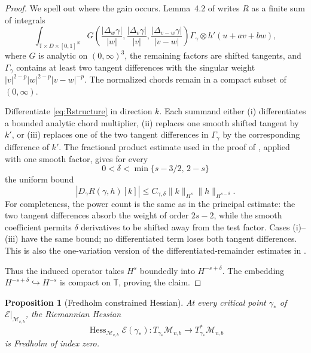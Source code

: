 \documentclass[11pt]{article}
\newtheorem{proposition}[theorem]{Proposition}
\theoremstyle{remark}
\newcommand{\T}{\mathbb T}
\newcommand{\E}{\mathcal E}
\newcommand{\M}{\mathcal M}
\begin{document}
\begin{proof}
We spell out where the gain occurs.  Lemma~4.2 of \cite{BR} writes $R$ as a
finite sum of integrals
\begin{equation}\label{eq:Rstructure}
 \int_{\T\times D\times[0,1]^N}
 G\!\left(\frac{|\Delta_w\gamma|}{|w|},
           \frac{|\Delta_v\gamma|}{|v|},
           \frac{|\Delta_{v-w}\gamma|}{|v-w|}\right)
 \Gamma_\gamma\otimes h'(u+av+bw),
\end{equation}
where $G$ is analytic on $(0,\infty)^3$, the remaining factors are shifted
tangents, and $\Gamma_\gamma$ contains at least two tangent differences with
the singular weight
$|v|^{2-p}|w|^{2-p}|v-w|^{-p}$.  The normalized chords remain in a compact
subset of $(0,\infty)$.

Differentiate \eqref{eq:Rstructure} in direction $k$.  Each summand either
(i) differentiates a bounded analytic chord multiplier, (ii) replaces one
smooth shifted tangent by $k'$, or (iii) replaces one of the two tangent
differences in $\Gamma_\gamma$ by the corresponding difference of $k'$.
The fractional product estimate used in the proof of
\cite[Proposition 4.3]{BR}, applied with one smooth factor, gives for every
\[
 0<\delta<\min\{s-3/2,\,2-s\}
\]
the uniform bound
\begin{equation}\label{eq:Rgain}
 |D_\gamma R(\gamma,h)[k]|
 \le C_{\gamma,\delta}\|k\|_{H^s}\|h\|_{H^{s-\delta}}.
\end{equation}
For completeness, the power count is the same as in the principal estimate:
the two tangent differences absorb the weight of order $2s-2$, while the
smooth coefficient permits $\delta$ derivatives to be shifted away from the
test factor.  Cases (i)--(iii) have the same bound; no differentiated term
loses both tangent differences.  This is also the one-variation version of
the differentiated-remainder estimates in \cite[Sections 3--4]{SV}.

Thus the induced operator takes $H^s$ boundedly into
$H^{-s+\delta}$.  The embedding $H^{-s+\delta}\hookrightarrow H^{-s}$ is
compact on $\T$, proving the claim.
\end{proof}

\begin{proposition}[Fredholm constrained Hessian]\label{prop:fredholm}
At every critical point $\gamma_*$ of $\E|_{\M_{v,b}}$, the Riemannian
Hessian
\[
 \operatorname{Hess}_{\M_{v,b}}\E(\gamma_*):
 T_{\gamma_*}\M_{v,b}\longrightarrow T_{\gamma_*}^*\M_{v,b}
\]
is Fredholm of index zero.
\end{proposition}
\end{document}
